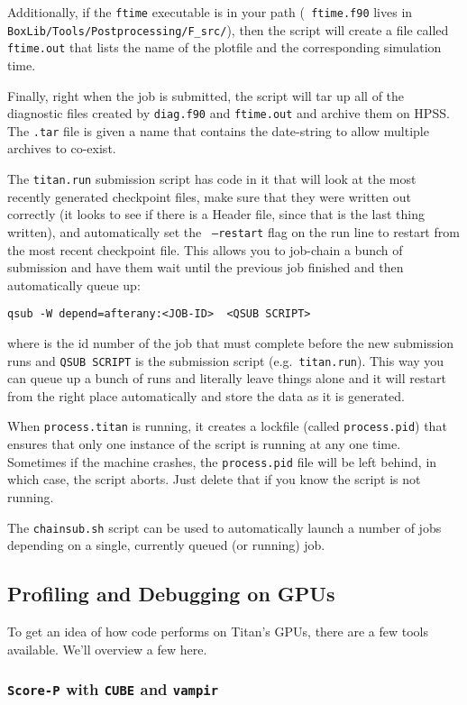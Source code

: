 Additionally, if the {\tt ftime} executable is in your path ({\tt
ftime.f90} lives in {\tt BoxLib/Tools/Postprocessing/F\_src/}), then
the script will create a file called {\tt ftime.out} that lists the
name of the plotfile and the corresponding simulation time.

Finally, right when the job is submitted, the script will tar up all
of the diagnostic files created by {\tt diag.f90} and {\tt ftime.out}
and archive them on HPSS.  The {\tt .tar} file is given a name that
contains the date-string to allow multiple archives to co-exist.

The {\tt titan.run} submission script has code in it that will look at
the most recently generated checkpoint files, make sure that they were
written out correctly (it looks to see if there is a Header file,
since that is the last thing written), and automatically set the {\tt
--restart} flag on the run line to restart from the most recent
checkpoint file.  This allows you to job-chain a bunch of submission
and have them wait until the previous job finished and then
automatically queue up:
\begin{verbatim}
qsub -W depend=afterany:<JOB-ID>  <QSUB SCRIPT>
\end{verbatim}
where {\tt <JOB-ID>} is the id number of the job that must complete
before the new submission runs and {\tt QSUB SCRIPT} is the submission
script (e.g.\ {\tt titan.run}).  This way you can queue up a bunch of
runs and literally leave things alone and it will restart from the
right place automatically and store the data as it is generated.

When {\tt process.titan} is running, it creates a lockfile (called
{\tt process.pid}) that ensures that only one instance of the script
is running at any one time.  Sometimes if the machine crashes, the
{\tt process.pid} file will be left behind, in which case, the script
aborts.  Just delete that if you know the script is not running.

The {\tt chainsub.sh} script can be used to automatically launch a
number of jobs depending on a single, currently queued (or running)
job.

\subsection{Profiling and Debugging on GPUs}
To get an idea of how code performs on Titan's GPUs, there are a few tools
available.  We'll overview a few here.

\subsubsection{{\tt Score-P} with {\tt CUBE} and {\tt vampir}}

